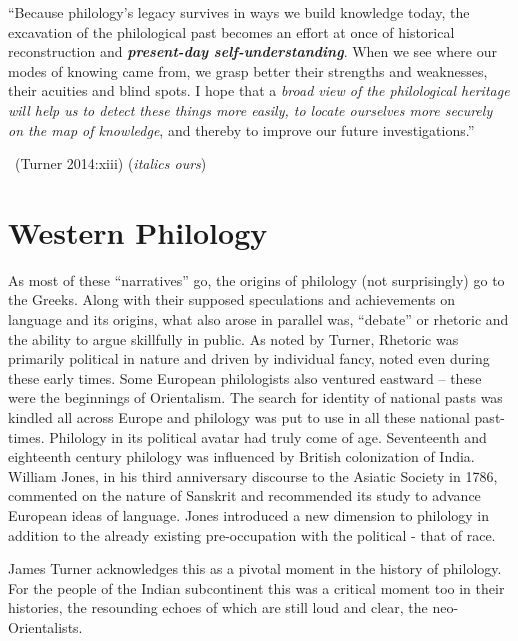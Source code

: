 \vskip 3pt

\begin{myquote}
“Because philology’s legacy survives in ways we build knowledge today, the excavation of the philological past becomes an effort at once of historical reconstruction and \textbf{\textit{present-day self-understanding}}. When we see where our modes of knowing came from, we grasp better their strengths and weaknesses, their acuities and blind spots. I hope that a \textit{broad view of the philological heritage will help us to detect these things more easily, to locate ourselves more securely on the map of knowledge}, and thereby to improve our future investigations.”

~\hfill (Turner 2014:xiii) (\textit{italics ours})
\end{myquote}


\section*{Western Philology}

\vskip 3pt

As most of these “narratives” go, the origins of philology (not surprisingly) go to the Greeks. Along with their supposed speculations and achievements on language and its origins, what also arose in parallel was, “debate” or rhetoric and the ability to argue skillfully in public. As noted by Turner, Rhetoric was primarily political in nature and driven by individual fancy, noted even during these early times. Some European philologists also ventured eastward – these were the beginnings of Orientalism. The search for identity of national pasts was kindled all across Europe and philology was put to use in all these national past-times. Philology in its political avatar had truly come of age. Seventeenth and eighteenth century philology was influenced by British colonization of India. William Jones, in his third anniversary discourse to the Asiatic Society in 1786, commented on the nature of Sanskrit and recommended its study to advance European ideas of language. Jones introduced a new dimension to philology in addition to the already existing pre-occupation with the political - that of race.

James Turner acknowledges this as a pivotal moment in the history of philology. For the people of the Indian subcontinent this was a critical moment too in their histories, the resounding echoes of which are still loud and clear, the neo-Orientalists.

